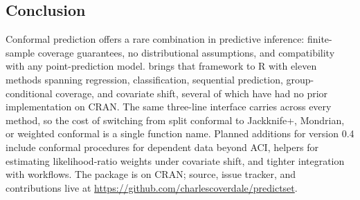 \FloatBarrier

\subsection{Conclusion}\label{conclusion}

Conformal prediction offers a rare combination in predictive inference:
finite-sample coverage guarantees, no distributional assumptions, and
compatibility with any point-prediction model. 
brings that framework to R with eleven methods spanning regression,
classification, sequential prediction, group-conditional coverage, and
covariate shift, several of which have had no prior implementation on
CRAN. The same three-line interface carries across every method, so the
cost of switching from split conformal to Jackknife+, Mondrian, or
weighted conformal is a single function name. Planned additions for
version 0.4 include conformal procedures for dependent data beyond ACI,
helpers for estimating likelihood-ratio weights under covariate shift,
and tighter integration with  workflows. The package
is on CRAN; source, issue tracker, and contributions live at
\url{https://github.com/charlescoverdale/predictset}.



\address{%
Charles Coverdale\\
London, United Kingdom\\%
United Kingdom\\
%
\url{https://github.com/charlescoverdale/predictset}\\%
%
\href{mailto:charles.f.coverdale@gmail.com}{\nolinkurl{charles.f.coverdale@gmail.com}}%
}
